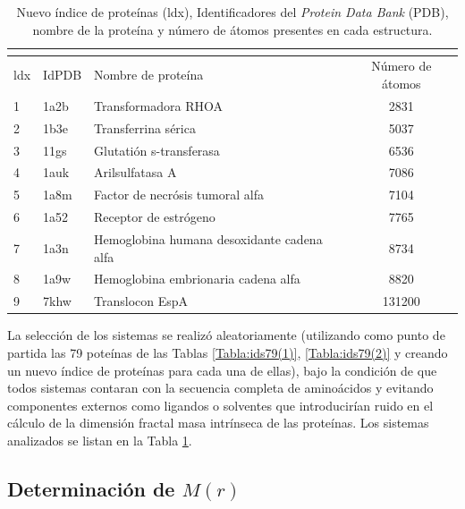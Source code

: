  	\begin{table}[H]
 		\centering
 		\begin{tabular}{||lllc||}
 			\multicolumn{4}{l}{} \\ 
 			\hline
 			ldx & IdPDB & Nombre de prote\'{i}na & N\'{u}mero de \'{a}tomos \\
 			\hline
 			 1  & 1a2b & Transformadora RHOA & 2831 \\
 			 2 & 1b3e & Transferrina s\'{e}rica & 5037 \\
 			 3 & 11gs & Glutati\'{o}n s-transferasa & 6536 \\ 
 			 4 & 1auk & Arilsulfatasa A & 7086 \\
 			 5 & 1a8m & Factor de necr\'{o}sis tumoral alfa & 7104 \\
 			 6 & 1a52 & Receptor de estr\'{o}geno & 7765 \\
 			 7 & 1a3n & Hemoglobina humana desoxidante cadena alfa & 8734 \\
 			 8 & 1a9w & Hemoglobina embrionaria cadena alfa & 8820 \\
			 9 & 7khw & Translocon EspA & 131200 \\
 			\hline
 		\end{tabular}
 		\caption{Nuevo \'{i}ndice de prote\'{i}nas (ldx), Identificadores del \emph{Protein Data Bank} (PDB), nombre de la prote\'{i}na y n\'{u}mero de \'{a}tomos presentes en cada estructura.}
 		\label{Tabla:ids9}
 	\end{table}
 	
 	
 	
 	La selecci\'{o}n de los sistemas se realiz\'{o} aleatoriamente (utilizando como punto de partida las 79 pote\'{i}nas de las Tablas \ref{Tabla:ids79(1)}, \ref{Tabla:ids79(2)} y creando un nuevo \'{i}ndice de prote\'{i}nas para cada una de ellas), bajo la condici\'{o}n de que todos sistemas contaran con la secuencia completa de amino\'{a}cidos y evitando componentes externos como ligandos o solventes que introducir\'{i}an ruido en el c\'{a}lculo de la dimensi\'{o}n fractal masa intr\'{i}nseca de las prote\'{i}nas. Los sistemas analizados se listan en la Tabla \ref{Tabla:ids9}.
 

	
	\subsection{Determinaci\'{o}n de $M(r)$}
	\label{sec:detM(r)}
	
